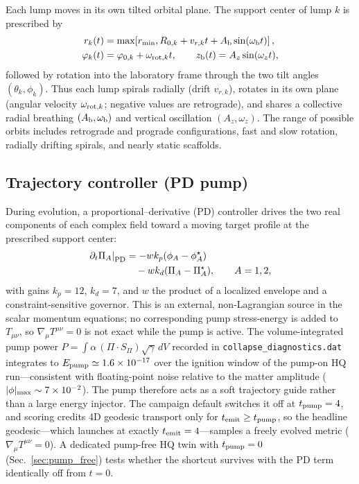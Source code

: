 \documentclass[twocolumn,floatfix,aps,prd,nofootinbib]{revtex4-2}
\begin{document}
Each lump moves in its own tilted orbital plane. The support center of lump $k$
is prescribed by
\begin{align}
r_k(t)&=\max\!\left[r_{\min},R_{0,k}+v_{r,k}t+
A_{\rm b}\sin(\omega_{\rm b}t)\right], \nonumber\\
\varphi_k(t)&=\varphi_{0,k}+\omega_{{\rm rot},k}t,\qquad
z_{\rm b}(t)=A_z\sin(\omega_z t),
\label{eq:lump_trajectory}
\end{align}
followed by rotation into the laboratory frame through the two tilt angles
$(\theta_k,\phi_k)$. Thus each lump spirals radially (drift $v_{r,k}$),
rotates in its own plane (angular velocity $\omega_{{\rm rot},k}$; negative
values are retrograde), and shares a collective radial breathing $(A_{\rm b},
\omega_{\rm b})$ and vertical oscillation $(A_z,\omega_z)$. The range of
possible orbits includes retrograde and prograde configurations, fast and slow
rotation, radially drifting spirals, and nearly static scaffolds.

\subsection{Trajectory controller (PD pump)}
\label{sec:pd_pump}

During evolution, a proportional--derivative (PD) controller drives the two
real components of each complex field toward a moving target profile at the
prescribed support center:
\begin{equation}
\begin{aligned}
\left.\partial_t\Pi_A\right|_{\rm PD}
  &=-w k_p(\phi_A-\phi_A^\star)\\
  &\quad-w k_d(\Pi_A-\Pi_A^\star),\qquad A=1,2 ,
\end{aligned}
\label{eq:pd_pump}
\end{equation}
with gains $k_p=12$, $k_d=7$, and $w$ the product of a localized envelope and
a constraint-sensitive governor. This is an external, non-Lagrangian source in
the scalar momentum equations; no corresponding pump stress-energy is added to
$T_{\mu\nu}$, so $\nabla_\mu T^{\mu\nu}=0$ is not exact while the pump is
active. The volume-integrated pump power
$P=\int\alpha\,(\Pi\cdot S_\Pi)\sqrt{\gamma}\,dV$ recorded in
\texttt{collapse\_diagnostics.dat} integrates to
$E_{\rm pump}\simeq1.6\times10^{-17}$ over the ignition window of the
pump-on HQ run---consistent with floating-point noise relative to the
matter amplitude ($|\phi|_{\rm max}\sim7\times10^{-2}$). The pump therefore
acts as a soft trajectory guide rather than a large energy injector. The
campaign default switches it off at $t_{\rm pump}=4$, and scoring credits
4D geodesic transport only for $t_{\rm emit}\ge t_{\rm pump}$, so the
headline geodesic---which launches at exactly $t_{\rm emit}=4$---samples a
freely evolved metric ($\nabla_\mu T^{\mu\nu}=0$). A dedicated pump-free HQ
twin with $t_{\rm pump}=0$ (Sec.~\ref{sec:pump_free}) tests whether the
shortcut survives with the PD term identically off from $t=0$.
\end{document}
